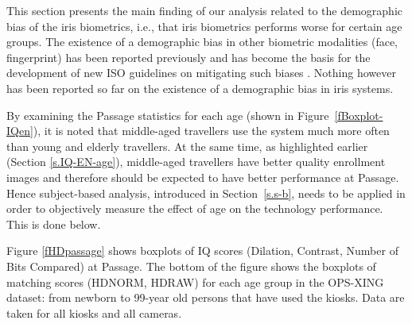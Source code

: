 \documentclass{cta-author}%
\begin{document}
This section presents the main finding of our analysis related to the demographic bias of the iris biometrics, i.e., that  iris biometrics performs worse for certain age groups.
The existence of a demographic bias in other biometric modalities (face, fingerprint)  has been reported previously and has become the basis for the development of new ISO guidelines on mitigating such biases \cite{ISO-bias}.  
Nothing however has been reported so far  on  the existence of a demographic bias in iris systems.  



By examining the Passage statistics for each age (shown in Figure~\ref{fBoxplot-IQen}), 
it is noted that  middle-aged travellers  use the system much more often than young and elderly travellers. 
At the same time, as highlighted earlier (Section \ref{s.IQ-EN-age}),  middle-aged travellers  have  better quality enrollment images and therefore should be expected to  have better performance at Passage. 
Hence 
subject-based analysis, introduced in Section~\ref{s.s-b}, needs to be applied in order to  objectively measure the effect of age on the technology performance.  This is done below.











Figure \ref{fHDpassage} shows boxplots of IQ scores  (Dilation, Contrast, Number of Bits Compared) at Passage. The bottom of the  figure shows the boxplots of matching scores (HDNORM, HDRAW) for each age group in the OPS-XING dataset: from newborn to 99-year old persons that have used the kiosks. Data are taken for all kiosks and all cameras.
\end{document}
